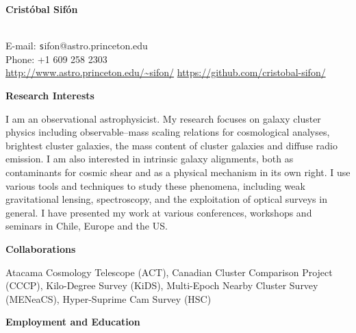 \documentclass[11pt]{article}
\newcommand\sectitle[1]{
  \vspace{0.5cm}
  \noindent
  \textbf{\large #1}\\
  \vspace{-0.2cm}
}
\begin{document}
\begin{minipage}[b]{0.46\linewidth}
\flushleft
\hspace{-0.7cm}
{\bf\huge Crist\'obal Sif\'on}\\\vspace{0.2cm}
\\
\end{minipage}
\begin{minipage}[b]{0.49\linewidth}
\flushright
{\large E-mail: {\texttt sifon@astro.princeton.edu}\\
        Phone: +1 609 258 2303\\
        \url{http://www.astro.princeton.edu/~sifon/}
        \url{https://github.com/cristobal-sifon/}}
\end{minipage}
\vspace{0.4cm}
\hline


\sectitle{Research Interests}

I am an observational astrophysicist.
My research focuses on galaxy cluster physics including observable--mass scaling relations for cosmological analyses, brightest cluster galaxies, the mass content of cluster galaxies and diffuse radio emission. I am also interested in intrinsic galaxy alignments, both as contaminants for cosmic shear and as a physical mechanism in its own right. I use various tools and techniques to study these phenomena, including weak gravitational lensing, spectroscopy, and the exploitation of optical surveys in general.
%
I have presented my work at various conferences, workshops and seminars in Chile, Europe and the US.

\sectitle{Collaborations}

Atacama Cosmology Telescope (ACT), Canadian Cluster Comparison Project (CCCP), Kilo-Degree Survey (KiDS), Multi-Epoch Nearby Cluster Survey (MENeaCS), Hyper-Suprime Cam Survey (HSC)


\sectitle{Employment and Education}
\end{document}
